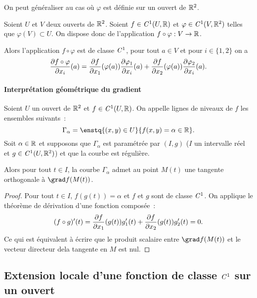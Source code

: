 %
On peut généraliser au cas où $\varphi$ est définie sur un ouvert de $\mathbb{R}^2$.
%
\begin{theo}
  Soient $U$ et $V$ deux ouverts de $\mathbb{R}^2$. Soient $f \in \mathit{C}^1(U, \mathbb{R})$ et $\varphi \in \mathit{C}^1(V, \mathbb{R}^2)$ telles que $\varphi(V) \subset U$. On dispose donc de l'application $f \circ \varphi : V \rightarrow \mathbb{R}$. 

Alors l'application $f\circ \varphi$ est de classe $\mathit{C}^1$, pour tout $a \in V$ et pour $i \in \{1, 2\}$ on a
\begin{equation}
  \dfrac{\partial f\circ \varphi}{\partial x_i}(a) = \dfrac{\partial f}{\partial x_1}(\varphi(a))\dfrac{\partial \varphi_1}{\partial x_i}(a) + \dfrac{\partial f}{\partial x_2}(\varphi(a))\dfrac{\partial \varphi_2}{\partial x_i}(a).
\end{equation}
\end{theo}

\paragraph{Interprétation géométrique du gradient}

\begin{prop}
  Soient $U$ un ouvert de $\mathbb{R}^2$ et $f \in \mathit{C}^1(U, \mathbb{R})$. On appelle lignes de niveaux de $f$ les ensembles suivants~:
  \begin{equation}
    \Gamma_\alpha = \enstq{(x,y) \in U}{f(x,y)=\alpha \in \R}.
  \end{equation}
  Soit $\alpha \in \mathbb{R}$ et supposons que $\Gamma_\alpha$ est paramétrée par $(I, g)$ ($I$ un intervalle réel et $g \in \mathit{C}^1(U, \mathbb{R}^2)$) et que la courbe est régulière. 

  Alors pour tout $t \in I$, la courbe $\Gamma_\alpha$ admet au point $M(t)$ une tangente orthogonale à $\grad f(M(t))$.
\end{prop}
\begin{proof}
  Pour tout $t \in I$, $f(g(t))=\alpha$ et $f$ et $g$ sont de classe $\mathit{C}^1$. On applique le théorème de dérivation d'une fonction composée~:
  \begin{equation}
    (f \circ g)'(t) = \dfrac{\partial f}{\partial x_1}(g(t))g_1'(t) + \dfrac{\partial f}{\partial x_2}(g(t))g_2'(t) = 0.
  \end{equation}
  Ce qui est équivalent à écrire que le produit scalaire entre $\grad f(M(t))$ et le vecteur directeur dela tangente en $M$ est nul.
\end{proof}

\subsection{Extension locale d'une fonction de classe $\mathit{C}^1$ sur un ouvert}

